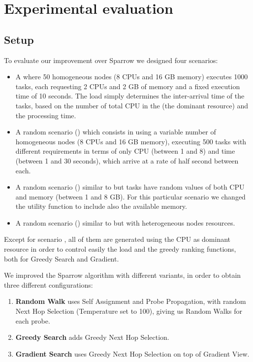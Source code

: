 \documentclass[conference]{IEEEtran}
\begin{document}
\section{Experimental evaluation}\label{sec:Evaluation}

  \subsection{Setup}
  To evaluate our improvement over Sparrow we designed four scenarios:
  \begin{itemize}

    \item A  where 50 homogeneous nodes (8 CPUs
      and 16 GB memory) executes 1000 tasks, each requesting 2 CPUs and 2 GB
      of memory and a fixed execution time of 10 seconds. The load simply
      determines the inter-arrival time of the tasks, based on the number
      of total CPU in the \dc (the dominant resource) and the processing
      time.

    \item A random scenario () which consists in using  a
      variable number of homogeneous nodes (8 CPUs and 16 GB memory),
      executing 500 tasks with different requirements in terms of only CPU
      (between 1 and 8) and time (between 1 and 30 seconds), which arrive
      at a rate of half second between each.

    \item A random scenario () similar to  but
      tasks have random values of both CPU and memory (between 1 and 8
      GB). For this particular scenario we changed the utility function to
      include also the available memory.

    \item A random scenario () similar to  but
      with heterogeneous nodes resources.

  \end{itemize}

  Except for scenario , all of them are generated using
  the CPU as dominant resource in order to control easily the load and the
  greedy ranking functions, both for Greedy Search and Gradient.

  We improved the Sparrow algorithm with different variants, in
  order to obtain three different configurations:
  \begin{enumerate}

    \item \textbf{Random Walk} uses Self Assignment and Probe Propagation,
      with random Next Hop Selection (Temperature set to 100), giving us
      Random Walks for each probe. 

    \item \textbf{Greedy Search} adds Greedy Next Hop Selection.

    \item \textbf{Gradient Search} uses Greedy Next Hop Selection on top
      of Gradient View.

  \end{enumerate}
\end{document}
